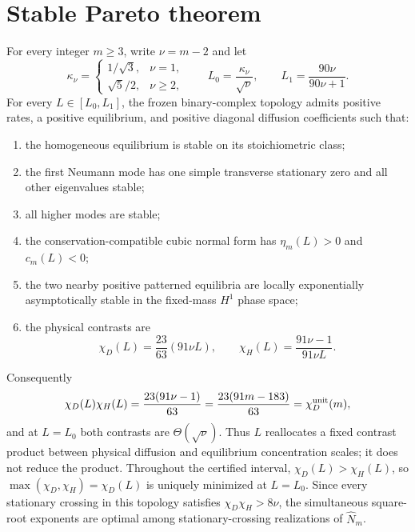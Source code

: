 \section*{Stable Pareto theorem}
For every integer $m\ge3$, write $\nu=m-2$ and let
\[
 \kappa_\nu=\begin{cases}
 1/\sqrt3,&\nu=1,\\
 \sqrt5/2,&\nu\ge2,
 \end{cases}
 \qquad
 L_0=\frac{\kappa_\nu}{\sqrt\nu},
 \qquad
 L_1=\frac{90\nu}{90\nu+1}.
\]
For every $L\in[L_0,L_1]$, the frozen binary-complex topology admits positive
rates, a positive equilibrium, and positive diagonal diffusion coefficients
such that:
\begin{enumerate}
\item the homogeneous equilibrium is stable on its stoichiometric class;
\item the first Neumann mode has one simple transverse stationary zero and all
other eigenvalues stable;
\item all higher modes are stable;
\item the conservation-compatible cubic normal form has $\eta_m(L)>0$ and
$c_m(L)<0$;
\item the two nearby positive patterned equilibria are locally exponentially
asymptotically stable in the fixed-mass $H^1$ phase space;
\item the physical contrasts are
\[
 \chi_D(L)=\frac{23}{63}(91\nu L),
 \qquad
 \chi_H(L)=\frac{91\nu-1}{91\nu L}.
\]
\end{enumerate}
Consequently
\[
 \chi_D(L)\chi_H(L)=\frac{23(91\nu-1)}{63}
 =\frac{23(91m-183)}{63}=\chi_D^{\rm unit}(m),
\]
and at $L=L_0$ both contrasts are $\Theta(\sqrt{\nu})$.  Thus $L$ reallocates
a fixed contrast product between physical diffusion and equilibrium
concentration scales; it does not reduce the product.  Throughout the
certified interval, $\chi_D(L)>\chi_H(L)$, so
$\max(\chi_D,\chi_H)=\chi_D(L)$ is uniquely minimized at $L=L_0$.
Since every stationary crossing in this topology satisfies
$\chi_D\chi_H>8\nu$, the simultaneous square-root exponents are optimal among
stationary-crossing realizations of $\widehat N_m$.


